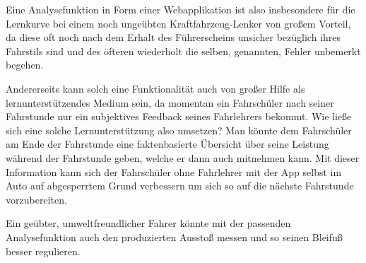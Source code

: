 Eine Analysefunktion in Form einer Webapplikation ist also insbesondere für die Lernkurve bei einem noch ungeübten Kraftfahrzeug-Lenker von großem Vorteil, da diese oft noch nach dem Erhalt des Führerscheins unsicher bezüglich ihres Fahrstils sind und des öfteren wiederholt die selben, genannten, Fehler unbemerkt begehen.

Andererseits kann solch eine Funktionalität auch von großer Hilfe als lernunterstützendes Medium sein, da momentan ein Fahrschüler nach seiner Fahrstunde nur ein subjektives Feedback seines Fahrlehrers bekommt. Wie ließe sich eine solche Lernunterstützung also umsetzen?
Man könnte dem Fahrschüler am Ende der Fahrstunde eine faktenbasierte Übersicht über seine Leistung während der Fahrstunde geben, welche er dann auch mitnehmen kann. Mit dieser Information kann sich der Fahrschüler ohne Fahrlehrer mit der App selbst im Auto auf abgesperrtem Grund verbessern um sich so auf die nächste Fahrstunde vorzubereiten.

Ein geübter, umweltfreundlicher Fahrer könnte mit der passenden Analysefunktion auch den produzierten  Ausstoß messen und so seinen Bleifuß besser regulieren.
\clearpage %
